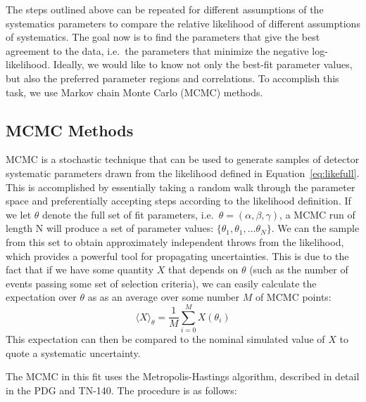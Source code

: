 The steps outlined above can be repeated for different assumptions of the
systematics parameters to compare the relative likelihood of different
assumptions of systematics.  The goal now is to find the parameters that give
the best agreement to the data, i.e.\ the parameters that minimize the negative
log-likelihood.  Ideally, we would like to know not only the best-fit parameter
values, but also the preferred parameter regions and correlations.  To
accomplish this task, we use Markov chain Monte Carlo (MCMC) methods.



\subsection{MCMC Methods}
\label{subsec:mcmc}

MCMC is a stochastic technique that can be used to generate samples of detector
systematic parameters drawn from the likelihood defined in
Equation~\ref{eq:likefull}.  This is accomplished by essentially taking a
random walk through the parameter space and preferentially accepting steps
according to the likelihood definition. If we let $\theta$ denote the full set
of fit parameters, i.e.\ $\theta = (\alpha,\beta,\gamma)$, a MCMC run of length
N will produce a set of parameter values: $\{\theta_{1}, \theta_{1}, \dots
\theta_{N}\}$.  We can the sample from this set to obtain approximately
independent throws from the likelihood, which provides a powerful tool for
propagating uncertainties.  This is due to the fact that if we have some
quantity $X$ that depends on $\theta$ (such as the number of events passing
some set of selection criteria), we can easily calculate the expectation over
$\theta$ as as an average over some number $M$ of MCMC points:
%
\begin{equation}
  \label{eq:mcmcexp}
  \langle X \rangle_{\theta} = \frac{1}{M}\sum\limits_{i=0}^{M}X(\theta_{i})
\end{equation}
%
This expectation can then be compared to the nominal simulated value of $X$ to
quote a systematic uncertainty.

The MCMC in this fit uses the Metropolis-Hastings algorithm, described
in detail in the PDG and TN-140.  The procedure is as follows:

